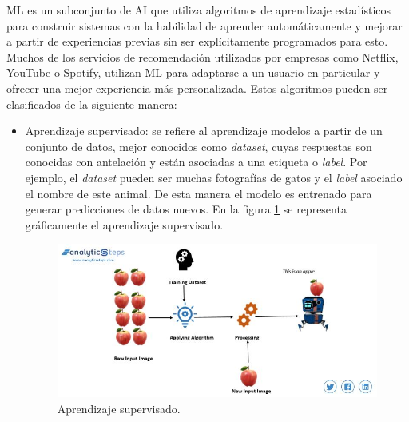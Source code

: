ML es un subconjunto de AI que utiliza algoritmos de aprendizaje estadísticos para construir sistemas con la habilidad de aprender automáticamente y mejorar a partir de experiencias previas sin ser explícitamente programados para esto. Muchos de los servicios de recomendación utilizados por empresas como Netflix, YouTube o Spotify, utilizan ML para adaptarse a un usuario en particular y ofrecer una mejor experiencia más personalizada. Estos algoritmos pueden ser clasificados de la siguiente manera:
\begin{itemize}
	\item Aprendizaje supervisado: se refiere al aprendizaje modelos a partir de un conjunto de datos, mejor conocidos como \textit{dataset}, cuyas respuestas son conocidas con antelación y están asociadas a una etiqueta o \textit{label}. Por ejemplo, el \textit{dataset} pueden ser muchas fotografías de gatos y el \textit{label} asociado el nombre de este animal. De esta manera el modelo es entrenado para generar predicciones de datos nuevos. En la figura \ref{fig:ml_sl} se representa gráficamente el aprendizaje supervisado.
	\begin{figure}[h]
		\centering
		\includegraphics[scale=0.4]{./Figures/ml_sl.jpg}
		\caption{Aprendizaje supervisado.}
		\label{fig:ml_sl}
	\end{figure}
	

\end{itemize}
